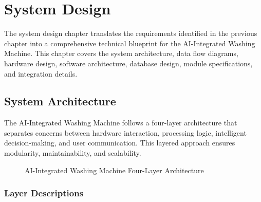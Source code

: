 \chapter{System Design}

The system design chapter translates the requirements identified in the previous chapter into a comprehensive technical blueprint for the AI-Integrated Washing Machine. This chapter covers the system architecture, data flow diagrams, hardware design, software architecture, database design, module specifications, and integration details.

\section{System Architecture}

The AI-Integrated Washing Machine follows a four-layer architecture that separates concerns between hardware interaction, processing logic, intelligent decision-making, and user communication. This layered approach ensures modularity, maintainability, and scalability.

\begin{figure}[H]
\centering
{}
\caption{AI-Integrated Washing Machine Four-Layer Architecture}
\label{fig:fourlayer}
\end{figure}

\subsection{Layer Descriptions}


